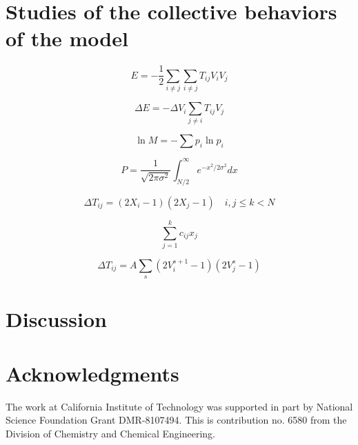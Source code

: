 \documentclass[10pt,letterpaper]{article}
\begin{document}
	\section{Studies of the collective behaviors of the model}
	\begin{equation}
		E = - \frac{1}{2} \sum_{i\neq j} \sum_{i\neq j} T_{ij}V_iV_j
	\end{equation}
	
	\begin{equation}
		\Delta E = - \Delta V_i \sum_{j \neq i} T_{ij}V_j
	\end{equation}
	
	\begin{equation}
		\ln M = - \sum p_i \ln p_i
	\end{equation}
	
	\begin{equation}
		P = \frac{1}{\sqrt{2 \pi \sigma^2}} \int_{N/2}^{\infty} e^{-x^2/2 \sigma^2} dx
	\end{equation}
	
	\begin{equation}
		\Delta T_{ij} = (2X_i -1)(2X_j -1) \quad i,j \leq k < N
	\end{equation}
	
	\begin{equation}
		\sum_{j=1}^{k} c_{ij} x_j
	\end{equation}
	
	\begin{equation}
		\Delta T_{ij} = A \sum_{s} (2V^{s+1}_i - 1)(2V^s_j - 1) 
	\end{equation}
	
	\section{Discussion}
	
	\section{Acknowledgments}
	The work at California Institute of Technology was supported in part by National Science Foundation Grant DMR-8107494. This is contribution no. 6580 from the Division of Chemistry and Chemical Engineering.
	
	
	
	
\end{document}
